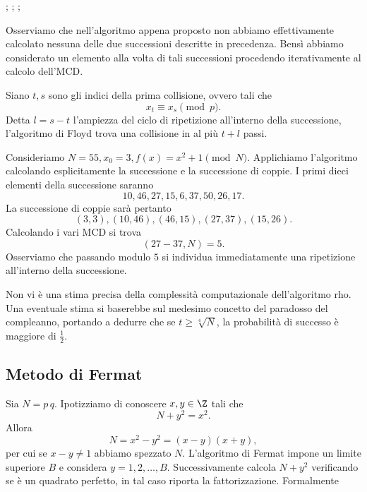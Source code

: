 	\begin{algorithmic}[1]
	\Statex
	;
	;
		;
	\EndWhile
		\State {}
	\Else
		\State {}
	\EndIf
	\end{algorithmic}

	Osserviamo che nell'algoritmo appena proposto non abbiamo effettivamente calcolato nessuna delle due successioni descritte in precedenza. Bensì abbiamo considerato un elemento alla volta di tali successioni procedendo iterativamente al calcolo dell'MCD.

	\begin{oss}
	Siano \(t,s\) sono gli indici della prima collisione, ovvero tali che
		\[
		x_t \equiv x_s \pmod{p}.
		\]
	Detta \(l=s-t\) l'ampiezza del ciclo di ripetizione all'interno della successione, l'algoritmo di Floyd trova una collisione in al più \(t+l\) passi.
	\end{oss}

	\begin{ese}
	Consideriamo \(N=55, x_0=3, f(x)=x^2+1 \pmod{N}\). Applichiamo l'algoritmo calcolando esplicitamente la successione e la successione di coppie. I primi dieci elementi della successione saranno
		\[
		10,46,27,15,6,37,50,26,17.
		\]
	La successione di coppie sarà pertanto
		\[
		(3,3),(10,46),(46,15),(27,37),(15,26).
		\]
	Calcolando i vari MCD si trova
		\[
		(27-37,N) = 5.
		\]
	Osserviamo che passando modulo \(5\) si individua immediatamente una ripetizione all'interno della successione.
	\end{ese}

	Non vi è una stima precisa della complessità computazionale dell'algoritmo rho. Una eventuale stima si baserebbe sul medesimo concetto del paradosso del compleanno, portando a dedurre che se \(t\ge \sqrt[4]{N}\), la probabilità di successo è maggiore di \(\frac{1}{2}\).

	\subsection{Metodo di Fermat}

	Sia \(N=p\,q\). Ipotizziamo di conoscere \(x,y\in\Z\) tali che
		\[
		N+y^2 = x^2.
		\]
	Allora
		\[
		N= x^2-y^2 = (x-y)(x+y),
		\]
	per cui se \(x-y \neq 1\) abbiamo spezzato \(N\).
	L'algoritmo di Fermat impone un limite superiore \(B\) e considera \(y=1,2,\ldots,B\). Successivamente calcola \(N+y^2\) verificando se è un quadrato perfetto, in tal caso riporta la fattorizzazione. Formalmente

